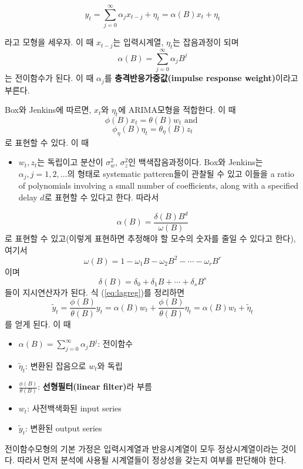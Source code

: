 \documentclass[b5paper,]{book}
\providecommand{\tightlist}{%
  \setlength{\itemsep}{0pt}\setlength{\parskip}{0pt}}
\theoremstyle{definition}
\theoremstyle{definition}
\theoremstyle{definition}
\theoremstyle{remark}
\begin{document}
\begin{equation}\label{eq:lagreg}
y_{t}=\sum_{j=0}^{\infty}\alpha_{j}x_{t-j}+\eta_{t}=\alpha(B)x_{t}+\eta_{t}
\end{equation}

라고 모형을 세우자. 이 때 \(x_{t-j}\)는 입력시계열, \(\eta_{t}\)는
잡음과정이 되며 \[\alpha(B)=\sum_{j=0}^{\infty}\alpha_{j}B^{j}\] 는
전이함수가 된다. 이 때 \(\alpha_{j}\)를 \textbf{충격반응가중값(impulse
response weight)}이라고 부른다.

Box와 Jenkins에 따르면, \(x_{t}\)와 \(\eta_{t}\)에 ARIMA모형을 적합한다.
이 때 \[\phi(B)x_{t}=\theta(B)w_{t} \text{ and }\]
\[\phi_{\eta}(B)\eta_{t}=\theta_{\eta}(B)z_{t}\] 로 표현할 수 있다. 이
때

\begin{itemize}
\tightlist
\item
  \(w_{t},z_{t}\)는 독립이고 분산이 \(\sigma_{w}^{2}\),
  \(\sigma_{z}^{2}\)인 백색잡음과정이다. Box와 Jenkins는
  \(\alpha_{j}, j=1,2,\ldots\)의 형태로 systematic patteren들이 관찰될
  수 있고 이들을 a ratio of polynomials involving a small number of
  coefficients, along with a specified delay \(d\)로 표현할 수 있다고
  한다. 따라서
\end{itemize}

\[\alpha(B)=\frac{\delta (B)B^{d}}{\omega(B)}\] 로 표현할 수 있고(이렇게
표현하면 추정해야 할 모수의 숫자를 줄일 수 있다고 한다), 여기서
\[\omega(B)=1-\omega_{1}B-\omega_{2}B^{2}-\cdots -\omega_{r}B^{r}\] 이며
\[\delta(B)=\delta_{0}+\delta_{1}B+\cdots +\delta_{s}B^{s}\] 들이
지시연산자가 된다. 식 (\eqref{eq:lagreg})를 정리하면
\[\tilde{y}_{t}=\frac{\phi(B)}{\theta(B)}y_{t}=\alpha(B)w_{t}+\frac{\phi(B)}{\theta(B)}\eta_{t}=\alpha(B)w_{t}+\tilde{\eta}_{t}\]
를 얻게 된다. 이 때

\begin{itemize}
\item
  \(\alpha(B)=\sum_{j=0}^{\infty}\alpha_{j}B^{j}\): 전이함수
\item
  \(\tilde{\eta}_{t}\): 변환된 잡음으로 \(w_{t}\)와 독립
\item
  \(\frac{\phi(B)}{\theta(B)}\): \textbf{선형필터(linear filter)}라 부름
\item
  \(w_{t}\): 사전백색화된 input series
\item
  \(\tilde{y}_{t}\): 변환된 output series
\end{itemize}

전이함수모형의 기본 가정은 입력시계열과 반응시계열이 모두
정상시계열이라는 것이다. 따라서 먼저 분석에 사용될 시계열들이 정상성을
갖는지 여부를 판단해야 한다.
\end{document}
